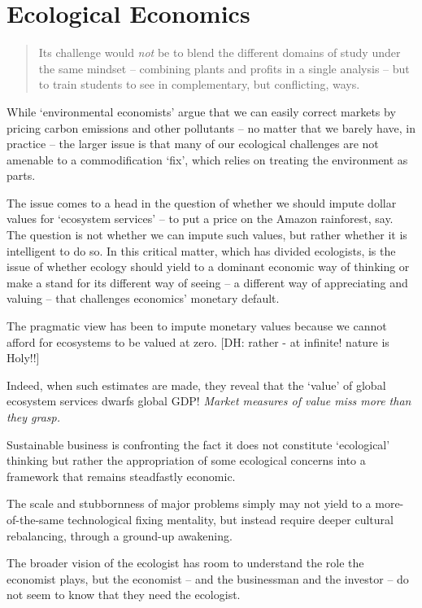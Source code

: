 \documentclass[
]{book}
\begin{document}
\hypertarget{ecological-economics}{%
\chapter{Ecological Economics}\label{ecological-economics}}

\begin{quote}
Its challenge would \emph{not} be to blend the different domains of study under the same mindset -- combining plants and profits in a single analysis -- but to train students to see in complementary, but conflicting, ways.
\end{quote}

While `environmental economists' argue that we can easily correct markets by pricing carbon emissions and other pollutants -- no matter that we barely have, in practice -- the larger issue is that many of our ecological challenges are not amenable to a commodification `fix', which relies on treating the environment as parts.

The issue comes to a head in the question of whether we should impute dollar values for `ecosystem services' -- to put a price on the Amazon rainforest, say. The question is not whether we can impute such values, but rather whether it is intelligent to do so. In this critical matter, which has divided ecologists, is the issue of whether ecology should yield to a dominant economic way of thinking or make a stand for its different way of seeing -- a different way of appreciating and valuing -- that challenges economics' monetary default.

The pragmatic view has been to impute monetary values because we cannot afford for ecosystems to be valued at zero. {[}DH: rather - at infinite! nature is Holy!!{]}

Indeed, when such estimates are made, they reveal that the `value' of global ecosystem services dwarfs global GDP! \emph{Market measures of value miss more than they grasp.}

Sustainable business is confronting the fact it does not constitute `ecological' thinking but rather the appropriation of some ecological concerns into a framework that remains steadfastly economic.

The scale and stubbornness of major problems simply may not yield to a more-of-the-same technological fixing mentality, but instead require deeper cultural rebalancing, through a ground-up awakening.

The broader vision of the ecologist has room to understand the role the economist plays, but the economist -- and the businessman and the investor -- do not seem to know that they need the ecologist.
\end{document}
